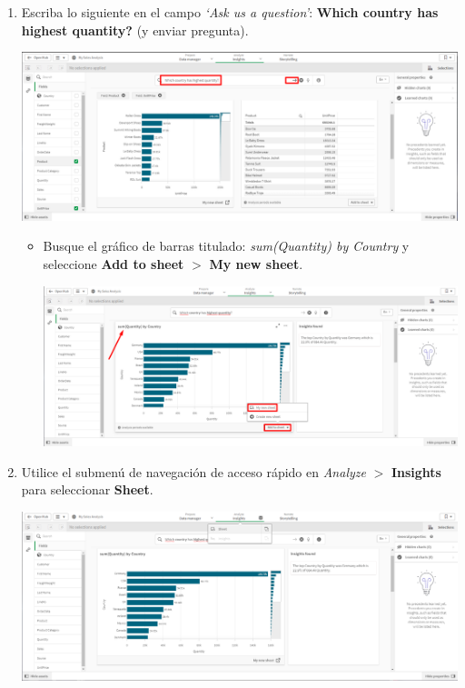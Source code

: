 \documentclass[12pt,letterpaper]{article}
\newcommand\tab[1][1cm]{\hspace*{#1}}
\begin{document}
\begin{enumerate}[\tab 1.]
\begin{itemize}
\begin{center}
            \end{center}
        \end{itemize}
        \item Escriba lo siguiente en el campo \textit{‘Ask us a question’}: \textbf{Which country has highest quantity?} (y enviar pregunta).
        \begin{center}
            \includegraphics[width=13cm]{./img/img11.png}
        \end{center}
        \begin{itemize}
            \item Busque el gráfico de barras titulado: \textit{sum(Quantity) by Country} y seleccione \textbf{Add to sheet} $>$ \textbf{My new sheet}.
            \begin{center}
                \includegraphics[width=13cm]{./img/img11.1.png}
            \end{center}
        \end{itemize}
        \item Utilice el submenú de navegación de acceso rápido en \textit{Analyze} $>$ \textbf{Insights} para seleccionar \textbf{Sheet}.
        \begin{center}
            \includegraphics[width=13cm]{./img/img12.png}

\end{center}
\end{enumerate}
\end{document}
